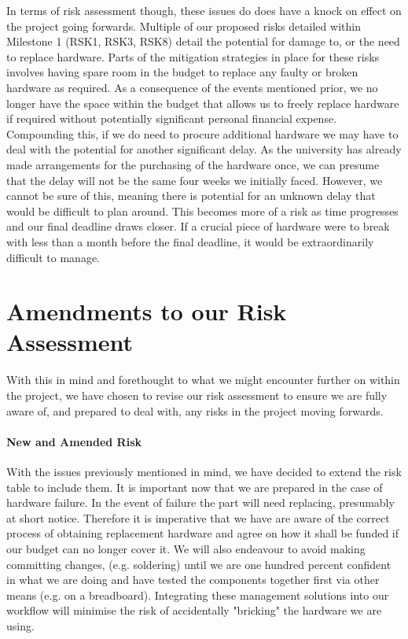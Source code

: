In terms of risk assessment though, these issues do does have a knock on effect on the project going forwards. Multiple of our proposed risks detailed within Milestone 1\cite{coaker} (RSK1, RSK3, RSK8) detail the potential for damage to, or the need to replace hardware. Parts of the mitigation strategies in place for these risks involves having spare room in the budget to replace any faulty or broken hardware as required. As a consequence of the events mentioned prior, we no longer have the space within the budget that allows us to freely replace hardware if required without potentially significant personal financial expense. Compounding this, if we do need to procure additional hardware we may have to deal with the potential for another significant delay. As the university has already made arrangements for the purchasing of the hardware once, we can presume that the delay will not be the same four weeks we initially faced. However, we cannot be sure of this, meaning there is potential for an unknown delay that would be difficult to plan around. This becomes more of a risk as time progresses and our final deadline draws closer. If a crucial piece of hardware were to break with less than a month before the final deadline, it would be extraordinarily difficult to manage.

\section{Amendments to our Risk Assessment}
With this in mind and forethought to what we might encounter further on within the project, we have chosen to revise our risk assessment to ensure we are fully aware of, and prepared to deal with, any risks in the project moving forwards. 

\paragraph{New and Amended Risk}
With the issues previously mentioned in mind, we have decided to extend the risk table to include them. It is important now that we are prepared in the case of hardware failure. In the event of failure the part will need replacing, presumably at short notice. Therefore it is imperative that we have are aware of the correct process of obtaining replacement hardware and agree on how it shall be funded if our budget can no longer cover it. We will also endeavour to avoid making committing changes, (e.g. soldering) until we are one hundred percent confident in what we are doing and have tested the components together first via other means (e.g. on a breadboard). Integrating these management solutions into our workflow will minimise the risk of accidentally "bricking" the hardware we are using.

